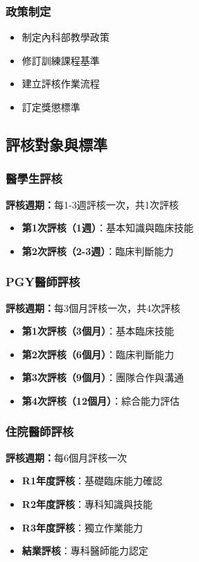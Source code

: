 \documentclass[12pt,a4paper]{article}
\begin{document}
\subsubsection{政策制定}
\begin{itemize}[nosep]
    \item 制定內科部教學政策
    \item 修訂訓練課程基準
    \item 建立評核作業流程
    \item 訂定獎懲標準
\end{itemize}

\subsection{評核對象與標準}

\subsubsection{醫學生評核}
\textbf{評核週期：}每1-3週評核一次，共1次評核
\begin{itemize}[nosep]
    \item \textbf{第1次評核（1週）}：基本知識與臨床技能
    \item \textbf{第2次評核（2-3週）}：臨床判斷能力
\end{itemize}

\subsubsection{PGY醫師評核}
\textbf{評核週期：}每3個月評核一次，共4次評核
\begin{itemize}[nosep]
    \item \textbf{第1次評核（3個月）}：基本臨床技能
    \item \textbf{第2次評核（6個月）}：臨床判斷能力
    \item \textbf{第3次評核（9個月）}：團隊合作與溝通
    \item \textbf{第4次評核（12個月）}：綜合能力評估
\end{itemize}
\subsubsection{住院醫師評核}
\textbf{評核週期：}每6個月評核一次
\begin{itemize}[nosep]
    \item \textbf{R1年度評核}：基礎臨床能力確認
    \item \textbf{R2年度評核}：專科知識與技能
    \item \textbf{R3年度評核}：獨立作業能力
    \item \textbf{結業評核}：專科醫師能力認定
\end{itemize}
\end{document}
